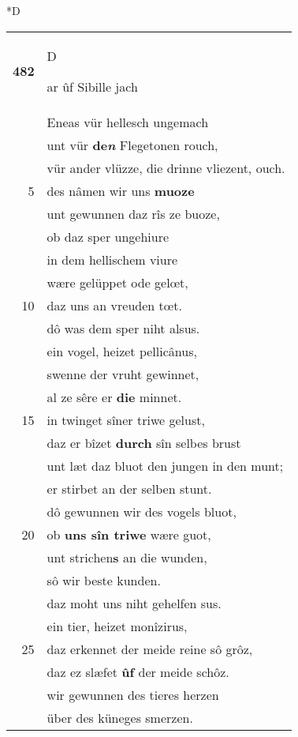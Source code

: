 \documentclass[8pt,a4paper,notitlepage]{article}
\begin{document}
\begin{table}[ht]
\begin{minipage}[t]{0.5\linewidth}
\small
\begin{center}*D
\end{center}
\begin{tabular}{rl}
\textbf{482} & \begin{large}D\end{large}ar ûf Sibille jach\\ 
 & Eneas vür hellesch ungemach\\ 
 & unt vür \textbf{de\textit{n}} Flegetonen rouch,\\ 
 & vür ander vlüzze, die drinne vliezent, ouch.\\ 
5 & des nâmen wir uns \textbf{muoze}\\ 
 & unt gewunnen daz rîs ze buoze,\\ 
 & ob daz sper ungehiure\\ 
 & in dem hellischem viure\\ 
 & wære gelüppet ode gelœt,\\ 
10 & daz uns an vreuden tœt.\\ 
 & dô was dem sper niht alsus.\\ 
 & ein vogel, heizet pellicânus,\\ 
 & swenne der vruht gewinnet,\\ 
 & al ze sêre er \textbf{die} minnet.\\ 
15 & in twinget sîner triwe gelust,\\ 
 & daz er bîzet \textbf{durch} sîn selbes brust\\ 
 & unt læt daz bluot den jungen in den munt;\\ 
 & er stirbet an der selben stunt.\\ 
 & dô gewunnen wir des vogels bluot,\\ 
20 & ob \textbf{uns sîn triwe} wære guot,\\ 
 & unt strichen\textbf{s} an die wunden,\\ 
 & sô wir beste kunden.\\ 
 & daz moht uns niht gehelfen sus.\\ 
 & ein tier, heizet monîzirus,\\ 
25 & daz erkennet der meide reine sô grôz,\\ 
 & daz ez slæfet \textbf{ûf} der meide schôz.\\ 
 & wir gewunnen des tieres herzen\\ 
 & über des küneges smerzen.\\ 

\end{tabular}
\end{minipage}
\end{table}
\end{document}
